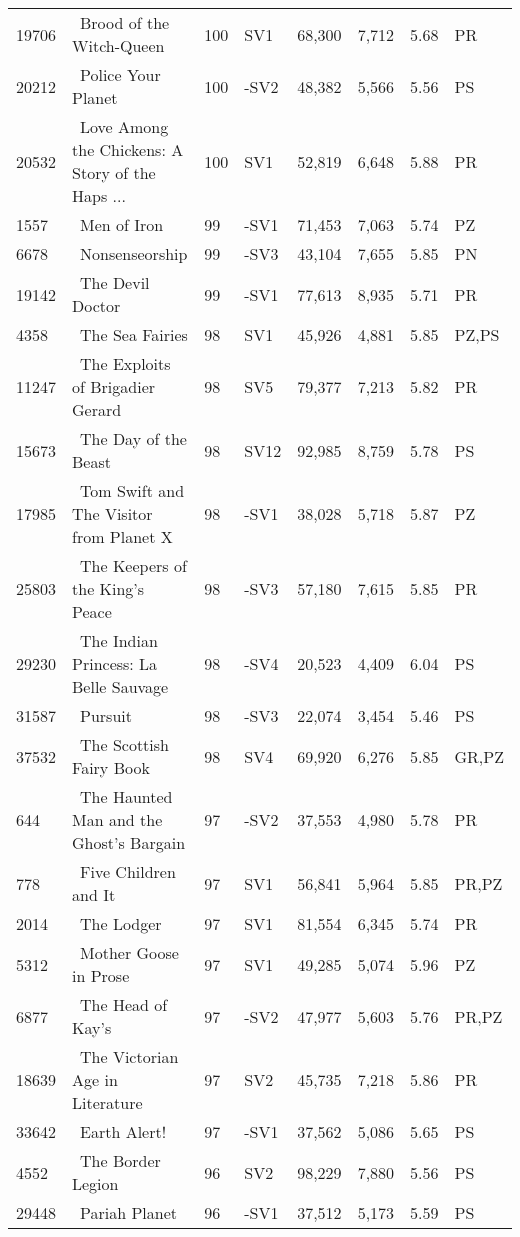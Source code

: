 \begin{longtable}{l | l | l | l | l | l | l | l}
19706 & ~Brood of the Witch-Queen & 100 & SV1 & 68,300 & 7,712 & 5.68 & PR\\
20212 & ~Police Your Planet & 100 & -SV2 & 48,382 & 5,566 & 5.56 & PS\\
20532 & ~Love Among the Chickens: A Story of the Haps ... & 100 & SV1 & 52,819 & 6,648 & 5.88 & PR\\
1557 & ~Men of Iron & 99 & -SV1 & 71,453 & 7,063 & 5.74 & PZ\\
6678 & ~Nonsenseorship & 99 & -SV3 & 43,104 & 7,655 & 5.85 & PN\\
19142 & ~The Devil Doctor & 99 & -SV1 & 77,613 & 8,935 & 5.71 & PR\\
4358 & ~The Sea Fairies & 98 & SV1 & 45,926 & 4,881 & 5.85 & PZ,PS\\
11247 & ~The Exploits of Brigadier Gerard & 98 & SV5 & 79,377 & 7,213 & 5.82 & PR\\
15673 & ~The Day of the Beast & 98 & SV12 & 92,985 & 8,759 & 5.78 & PS\\
17985 & ~Tom Swift and The Visitor from Planet X & 98 & -SV1 & 38,028 & 5,718 & 5.87 & PZ\\
25803 & ~The Keepers of the King's Peace & 98 & -SV3 & 57,180 & 7,615 & 5.85 & PR\\
29230 & ~The Indian Princess: La Belle Sauvage & 98 & -SV4 & 20,523 & 4,409 & 6.04 & PS\\
31587 & ~Pursuit & 98 & -SV3 & 22,074 & 3,454 & 5.46 & PS\\
37532 & ~The Scottish Fairy Book & 98 & SV4 & 69,920 & 6,276 & 5.85 & GR,PZ\\
644 & ~The Haunted Man and the Ghost's Bargain & 97 & -SV2 & 37,553 & 4,980 & 5.78 & PR\\
778 & ~Five Children and It & 97 & SV1 & 56,841 & 5,964 & 5.85 & PR,PZ\\
2014 & ~The Lodger & 97 & SV1 & 81,554 & 6,345 & 5.74 & PR\\
5312 & ~Mother Goose in Prose & 97 & SV1 & 49,285 & 5,074 & 5.96 & PZ\\
6877 & ~The Head of Kay's & 97 & -SV2 & 47,977 & 5,603 & 5.76 & PR,PZ\\
18639 & ~The Victorian Age in Literature & 97 & SV2 & 45,735 & 7,218 & 5.86 & PR\\
33642 & ~Earth Alert! & 97 & -SV1 & 37,562 & 5,086 & 5.65 & PS\\
4552 & ~The Border Legion & 96 & SV2 & 98,229 & 7,880 & 5.56 & PS\\
29448 & ~Pariah Planet & 96 & -SV1 & 37,512 & 5,173 & 5.59 & PS\\

\end{longtable}

